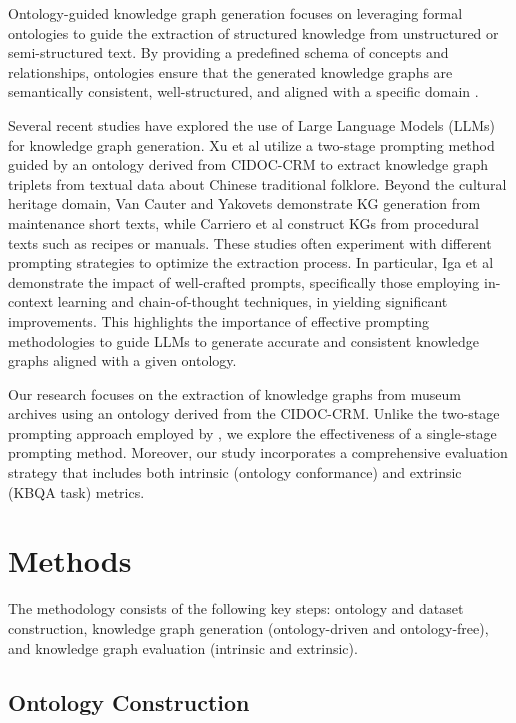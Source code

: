 \documentclass[a4, conference]{IEEEtran}
\begin{document}
Ontology-guided knowledge graph generation focuses on leveraging formal ontologies to guide the extraction of structured knowledge from unstructured or semi-structured text. By providing a predefined schema of concepts and relationships, ontologies ensure that the generated knowledge graphs are semantically consistent, well-structured, and aligned with a specific domain \cite{hofer2024constructionofknowledge}.

Several recent studies have explored the use of Large Language Models (LLMs) for knowledge graph generation. Xu et al \cite{xu2024chattf} utilize a two-stage prompting method guided by an ontology derived from CIDOC-CRM to extract knowledge graph triplets from textual data about Chinese traditional folklore. Beyond the cultural heritage domain, Van Cauter and Yakovets \cite{cauter2024ontology} demonstrate KG generation from maintenance short texts, while Carriero et al \cite{carriero2025humanevaluationofprocedural} construct KGs from procedural texts such as recipes or manuals. These studies often experiment with different prompting strategies to optimize the extraction process. In particular, Iga et al \cite{iga2024assessllm} demonstrate the impact of well-crafted prompts, specifically those employing in-context learning and chain-of-thought techniques, in yielding significant improvements. This highlights the importance of effective prompting methodologies to guide LLMs to generate accurate and consistent knowledge graphs aligned with a given ontology.

Our research focuses on the extraction of knowledge graphs from museum archives using an ontology derived from the CIDOC-CRM. Unlike the two-stage prompting approach employed by \cite{xu2024chattf}, we explore the effectiveness of a single-stage prompting method. Moreover, our study incorporates a comprehensive evaluation strategy that includes both intrinsic (ontology conformance) and extrinsic (KBQA task) metrics.

\section{Methods}
\label{sec:methods}

The methodology consists of the following key steps: ontology and dataset construction, knowledge graph generation (ontology-driven and ontology-free), and knowledge graph evaluation (intrinsic and extrinsic).

\subsection{Ontology Construction}
\end{document}
